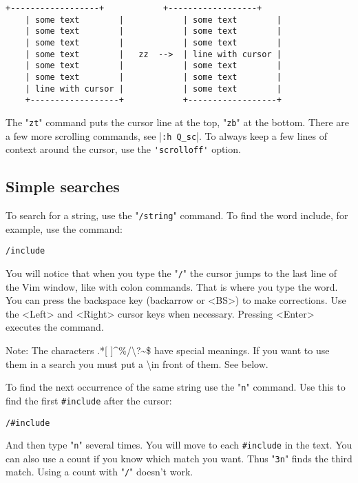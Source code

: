 \begin{Verbatim}[samepage=true]
    +------------------+            +------------------+
    | some text        |            | some text        |
    | some text        |            | some text        |
    | some text        |            | some text        |
    | some text        |   zz  -->  | line with cursor |
    | some text        |            | some text        |
    | some text        |            | some text        |
    | line with cursor |            | some text        |
    +------------------+            +------------------+
\end{Verbatim}

The "\verb!zt!" command puts the cursor line at the top, "\verb!zb!" at the bottom.
There are a few more scrolling commands, see |\verb!:h Q_sc!|.
To always keep a few lines of context around the cursor, use the \verb!'scrolloff'! option.

\subsection{Simple searches}

To search for a string, use the "\verb!/string!" command.
To find the word include, for example, use the command:

 \begin{Verbatim}[samepage=true]
 /include
 \end{Verbatim}

You will notice that when you type the "\verb!/!" the cursor jumps to the last line of the Vim window, like with colon commands.
That is where you type the word.
You can press the backspace key (backarrow or <BS>) to make corrections.
Use the <Left> and <Right> cursor keys when necessary.
Pressing <Enter> executes the command.

Note:
The characters .*[ ]\textasciicircum\%/\textbackslash?\textasciitilde\$ have special meanings.
If you want to use them in a search you must put a \textbackslash in front of them.
See below.

To find the next occurrence of the same string use the "\verb!n!" command.
Use this to find the first \verb!#include! after the cursor:%

 \begin{Verbatim}[samepage=true]
 /#include
 \end{Verbatim}

And then type "\verb!n!" several times.
You will move to each \verb!#include! in the text.
You can also use a count if you know which match you want.
Thus "\verb!3n!" finds the third match.
Using a count with "\verb!/!" doesn't work.

